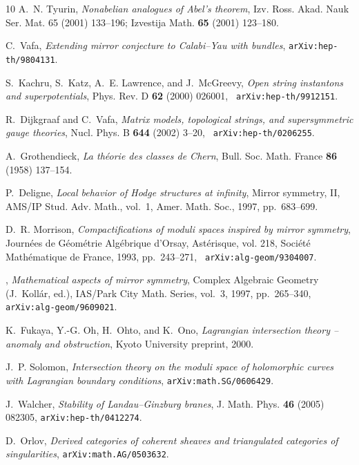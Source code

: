 \begin{thebibliography}{10}
A.~N. Tyurin, {\em Nonabelian analogues of {A}bel's theorem}, Izv. Ross. Akad.
  Nauk Ser. Mat. 65 (2001) 133--196; Izvestija Math. {\bf 65} (2001) 123--180.

C.~Vafa, {\em Extending mirror conjecture to {C}alabi--{Y}au with bundles},
  {\tt arXiv:hep-th/9804131}.

S.~Kachru, S.~Katz, A.~E. Lawrence, and J.~McGreevy, {\em Open string
  instantons and superpotentials}, Phys. Rev. D {\bf 62} (2000) 026001, {\tt
  arXiv:hep-th/9912151}.

R.~Dijkgraaf and C.~Vafa, {\em Matrix models, topological strings, and
  supersymmetric gauge theories}, Nucl. Phys. B {\bf 644} (2002) 3--20, {\tt
  arXiv:hep-th/0206255}.

A.~Grothendieck, {\em La th\'eorie des classes de {C}hern}, Bull. Soc. Math.
  France {\bf 86} (1958) 137--154.

P.~Deligne, {\em Local behavior of {H}odge structures at infinity}, Mirror
  symmetry, II, AMS/IP Stud. Adv. Math., vol.~1, Amer. Math. Soc., 1997,
  pp.~683--699.

D.~R. Morrison, {\em Compactifications of moduli spaces inspired by mirror
  symmetry}, Journ\'ees de G\'eom\'etrie Alg\'ebrique d'Orsay, Ast\'erisque,
  vol. 218, Soci\'et\'e Math\'ematique de France, 1993, pp.~243--271, {\tt
  arXiv:alg-geom/9304007}.

\bysame, {\em Mathematical aspects of mirror symmetry}, Complex Algebraic
  Geometry (J.~Koll\'ar, ed.), IAS/Park City Math. Series, vol.~3, 1997,
  pp.~265--340, {\tt arXiv:alg-geom/9609021}.

K.~Fukaya, Y.-G. Oh, H.~Ohto, and K.~Ono, {\em Lagrangian intersection theory
  -- anomaly and obstruction}, Kyoto University preprint, 2000.

J.~P. Solomon, {\em Intersection theory on the moduli space of holomorphic
  curves with {L}agrangian boundary conditions}, {\tt arXiv:math.SG/0606429}.

J.~Walcher, {\em Stability of {L}andau--{G}inzburg branes}, J. Math. Phys. {\bf
  46} (2005) 082305, {\tt arXiv:hep-th/0412274}.

D.~Orlov, {\em Derived categories of coherent sheaves and triangulated
  categories of singularities}, {\tt arXiv:math.AG/0503632}.


\end{thebibliography}
